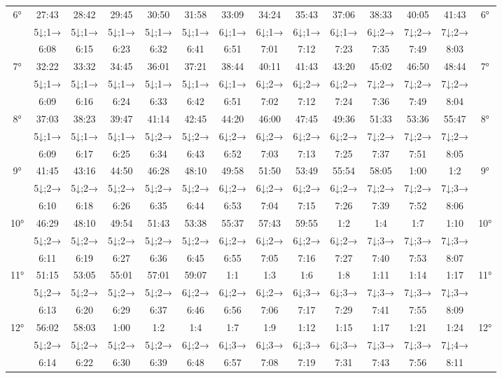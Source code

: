 \begin{scriptsize}
\begin{tabular}{c || c | c | c | c | c | c | c | c | c | c | c | c || c}
		\multirow{3}{*}{6°}&27:43&28:42&29:45&30:50&31:58&33:09&34:24&35:43&37:06&38:33&40:05&41:43&\multirow{3}{*}{6°}\\ \space&5↓;1→&5↓;1→&5↓;1→&5↓;1→&5↓;1→&6↓;1→&6↓;1→&6↓;1→&6↓;1→&6↓;2→&7↓;2→&7↓;2→&\space\\&6:08&6:15&6:23&6:32&6:41&6:51&7:01&7:12&7:23&7:35&7:49&8:03&\space\\\hline
		\multirow{3}{*}{7°}&32:22&33:32&34:45&36:01&37:21&38:44&40:11&41:43&43:20&45:02&46:50&48:44&\multirow{3}{*}{7°}\\ \space&5↓;1→&5↓;1→&5↓;1→&5↓;1→&5↓;1→&6↓;1→&6↓;2→&6↓;2→&6↓;2→&7↓;2→&7↓;2→&7↓;2→&\space\\&6:09&6:16&6:24&6:33&6:42&6:51&7:02&7:12&7:24&7:36&7:49&8:04&\space\\\hline
		\multirow{3}{*}{8°}&37:03&38:23&39:47&41:14&42:45&44:20&46:00&47:45&49:36&51:33&53:36&55:47&\multirow{3}{*}{8°}\\ \space&5↓;1→&5↓;1→&5↓;1→&5↓;2→&5↓;2→&6↓;2→&6↓;2→&6↓;2→&6↓;2→&7↓;2→&7↓;2→&7↓;2→&\space\\&6:09&6:17&6:25&6:34&6:43&6:52&7:03&7:13&7:25&7:37&7:51&8:05&\space\\\hline
		\multirow{3}{*}{9°}&41:45&43:16&44:50&46:28&48:10&49:58&51:50&53:49&55:54&58:05&1:00&1:2&\multirow{3}{*}{9°}\\ \space&5↓;2→&5↓;2→&5↓;2→&5↓;2→&5↓;2→&6↓;2→&6↓;2→&6↓;2→&6↓;2→&7↓;2→&7↓;2→&7↓;3→&\space\\&6:10&6:18&6:26&6:35&6:44&6:53&7:04&7:15&7:26&7:39&7:52&8:06&\space\\\hline
		\multirow{3}{*}{10°}&46:29&48:10&49:54&51:43&53:38&55:37&57:43&59:55&1:2&1:4&1:7&1:10&\multirow{3}{*}{10°}\\ \space&5↓;2→&5↓;2→&5↓;2→&5↓;2→&5↓;2→&6↓;2→&6↓;2→&6↓;2→&6↓;2→&7↓;3→&7↓;3→&7↓;3→&\space\\&6:11&6:19&6:27&6:36&6:45&6:55&7:05&7:16&7:27&7:40&7:53&8:07&\space\\\hline
		\multirow{3}{*}{11°}&51:15&53:05&55:01&57:01&59:07&1:1&1:3&1:6&1:8&1:11&1:14&1:17&\multirow{3}{*}{11°}\\ \space&5↓;2→&5↓;2→&5↓;2→&5↓;2→&6↓;2→&6↓;2→&6↓;2→&6↓;3→&6↓;3→&7↓;3→&7↓;3→&7↓;3→&\space\\&6:13&6:20&6:29&6:37&6:46&6:56&7:06&7:17&7:29&7:41&7:55&8:09&\space\\\hline
		\multirow{3}{*}{12°}&56:02&58:03&1:00&1:2&1:4&1:7&1:9&1:12&1:15&1:17&1:21&1:24&\multirow{3}{*}{12°}\\ \space&5↓;2→&5↓;2→&5↓;2→&5↓;2→&6↓;2→&6↓;3→&6↓;3→&6↓;3→&6↓;3→&7↓;3→&7↓;3→&7↓;4→&\space\\&6:14&6:22&6:30&6:39&6:48&6:57&7:08&7:19&7:31&7:43&7:56&8:11&\space\\\hline

\end{tabular}
\end{scriptsize}
